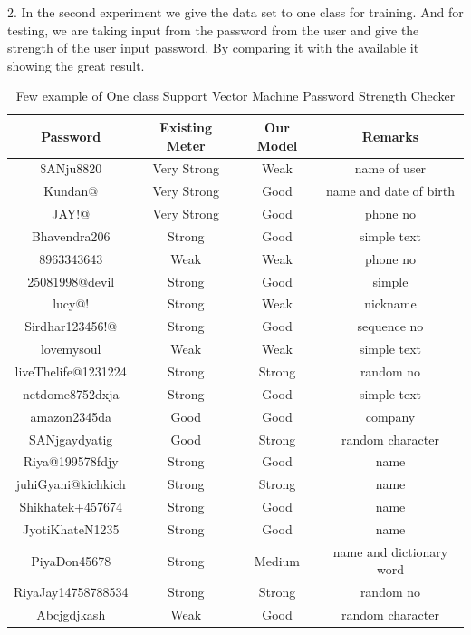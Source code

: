\documentclass[runningheads]{llncs}
\begin{document}
{\begin{figure}
\end{figure}
\hfill
\par
2. In the second experiment we give the data set to one class for training. And for testing, we are taking input from the password from the user and give the strength of the user input password. By comparing it with the available it showing the great result.
\begin{table}[htb]
\caption{Few example of One class Support Vector Machine Password Strength Checker}
\begin{tabular}{||c||c||c||c||}
	\hline
	\hline
	\textbf{Password} & \textbf{Existing Meter} & \textbf{Our Model}&\textbf{Remarks} \\
	\hline
	
     \$ANju8820   & Very Strong & Weak & name of user \\
 \hline
 Kundan@#1994  & Very Strong  & Good & name and date of birth \\
 \hline
 JAY!@#882037820  & Very Strong & Good & phone no \\
 \hline
 Bhavendra206 & Strong & Good & simple text\\
 \hline
 8963343643 & Weak & Weak & phone no\\
 \hline
 25081998@devil & Strong & Good & simple\\
 \hline
 lucy@!#9863 & Strong & Weak  & nickname\\
 \hline
 Sirdhar123456!@ & Strong & Good& sequence no\\
 \hline
 lovemysoul & Weak & Weak& simple text\\
 \hline
 liveThelife@1231224 & Strong& Strong& random no\\
 \hline
 netdome8752dxja &Strong &Good& simple text\\
 \hline
 amazon2345da & Good & Good& company\\ 
 \hline
 SANjgaydyatig & Good & Strong& random character\\
 \hline
 Riya@199578fdjy & Strong & Good& name\\
 \hline
 juhiGyani@kichkich & Strong& Strong& name\\
 \hline
 Shikhatek+457674 &Strong & Good& name\\
 \hline
 JyotiKhateN1235 & Strong & Good& name\\
 \hline
 PiyaDon45678 & Strong & Medium& name and dictionary word\\
 \hline
 RiyaJay14758788534 & Strong & Strong& random no\\
\hline
Abcjgdjkash & Weak & Good& random character\\

\end{tabular}
\end{table}}
\end{document}
